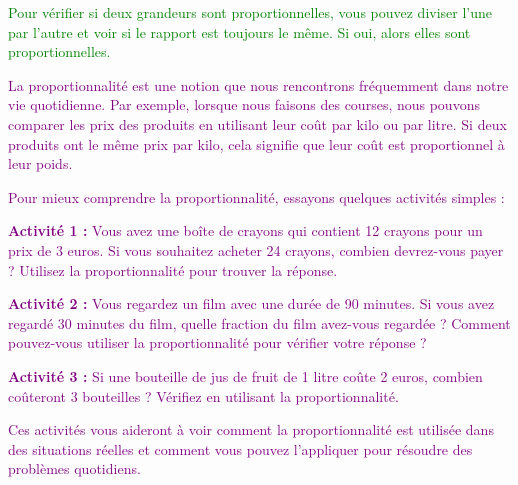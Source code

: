 \documentclass{article}
\begin{document}
\vspace{0.2cm}

\begin{tcolorbox}[colback=green!10!white, colframe=green!75!black, title=\textcolor{white}{Remarque}, 
                  sharp corners=south]
    \textcolor{green}{Pour vérifier si deux grandeurs sont proportionnelles, vous pouvez diviser l'une par l'autre et voir si le rapport est toujours le même. Si oui, alors elles sont proportionnelles.}
\end{tcolorbox}

\vspace{0.5cm}

\textcolor{purple}{La proportionnalité est une notion que nous rencontrons fréquemment dans notre vie quotidienne. Par exemple, lorsque nous faisons des courses, nous pouvons comparer les prix des produits en utilisant leur coût par kilo ou par litre. Si deux produits ont le même prix par kilo, cela signifie que leur coût est proportionnel à leur poids.}

\vspace{0.2cm}

\textcolor{purple}{Pour mieux comprendre la proportionnalité, essayons quelques activités simples :}

\vspace{0.2cm}

\textcolor{purple}{\textbf{Activité 1 :} Vous avez une boîte de crayons qui contient 12 crayons pour un prix de 3 euros. Si vous souhaitez acheter 24 crayons, combien devrez-vous payer ? Utilisez la proportionnalité pour trouver la réponse.}

\vspace{0.2cm}

\textcolor{purple}{\textbf{Activité 2 :} Vous regardez un film avec une durée de 90 minutes. Si vous avez regardé 30 minutes du film, quelle fraction du film avez-vous regardée ? Comment pouvez-vous utiliser la proportionnalité pour vérifier votre réponse ?}

\vspace{0.2cm}

\textcolor{purple}{\textbf{Activité 3 :} Si une bouteille de jus de fruit de 1 litre coûte 2 euros, combien coûteront 3 bouteilles ? Vérifiez en utilisant la proportionnalité.}

\vspace{0.2cm}

\textcolor{purple}{Ces activités vous aideront à voir comment la proportionnalité est utilisée dans des situations réelles et comment vous pouvez l'appliquer pour résoudre des problèmes quotidiens.}
\end{document}
